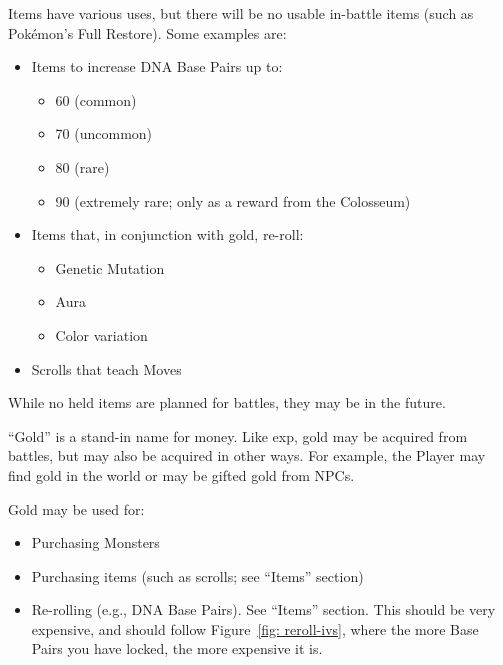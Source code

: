 Items have various uses, but there will be no usable in-battle items (such as Pok\'{e}mon's Full Restore). Some examples are:

\begin{itemize}
	\item{Items to increase DNA Base Pairs up to:
		\begin{itemize}
			\item{60 (common)}
			\item{70 (uncommon)}
			\item{80 (rare)}
			\item{90 (extremely rare; only as a reward from the Colosseum)}
		\end{itemize}
	}
	\item{Items that, in conjunction with gold, re-roll:
		\begin{itemize}
			\item{Genetic Mutation}
			\item{Aura}
			\item{Color variation}
		\end{itemize}
	}
	\item{Scrolls that teach Moves}
\end{itemize}
While no held items are planned for battles, they may be in the future.

``Gold'' is a stand-in name for money. Like exp, gold may be acquired from battles, but may also be acquired in other ways. For example, the Player may find gold in the world or may be gifted gold from NPCs.

Gold may be used for:
\begin{itemize}
	\item{Purchasing Monsters}
	\item{Purchasing items (such as scrolls; see ``Items'' section)}
	\item{Re-rolling (e.g., DNA Base Pairs). See ``Items'' section. This should be very expensive, and should follow Figure~\ref{fig: reroll-ivs}, where the more Base Pairs you have locked, the more expensive it is.}
\end{itemize}


